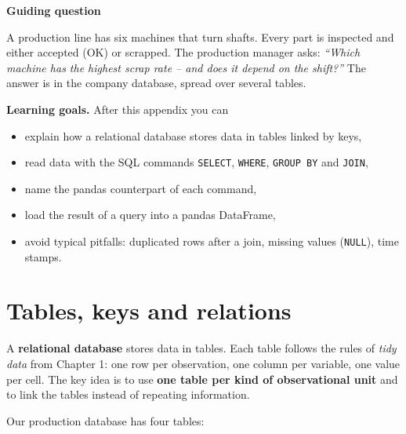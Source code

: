 \documentclass[
  letterpaper,
  DIV=11,
  numbers=noendperiod]{scrreprt}
\providecommand{\tightlist}{%
  \setlength{\itemsep}{0pt}\setlength{\parskip}{0pt}}\usepackage{longtable,booktabs,array}
\begin{document}
\textbf{Guiding question}

A production line has six machines that turn shafts. Every part is
inspected and either accepted (OK) or scrapped. The production manager
asks: \emph{``Which machine has the highest scrap rate -- and does it
depend on the shift?''} The answer is in the company database, spread
over several tables.

\textbf{Learning goals.} After this appendix you can

\begin{itemize}
\tightlist
\item
  explain how a relational database stores data in tables linked by
  keys,
\item
  read data with the SQL commands \texttt{SELECT}, \texttt{WHERE},
  \texttt{GROUP\ BY} and \texttt{JOIN},
\item
  name the pandas counterpart of each command,
\item
  load the result of a query into a pandas DataFrame,
\item
  avoid typical pitfalls: duplicated rows after a join, missing values
  (\texttt{NULL}), time stamps.
\end{itemize}

\section{Tables, keys and relations}\label{tables-keys-and-relations}

A \textbf{relational database} stores data in tables. Each table follows
the rules of \emph{tidy data} from Chapter 1: one row per observation,
one column per variable, one value per cell. The key idea is to use
\textbf{one table per kind of observational unit} and to link the tables
instead of repeating information.

Our production database has four tables:
\end{document}
